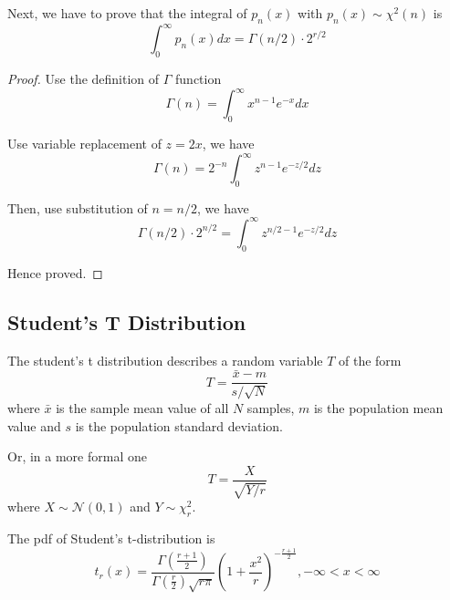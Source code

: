 \begin{lemma}
    \label{lemma: The Pdf of Chi-squared Distribution is a Pdf}
    Next, we have to prove that the integral of $p_n(x)$ with $p_n(x) \sim \chi^2(n)$ is
    \begin{equation*}
        \int_0^\infty p_n(x) dx = \Gamma(n/2) \cdot 2^{r/2}
    \end{equation*}

\end{lemma}

\begin{proof}
    Use the definition of $\Gamma$ function
    \begin{equation*}
        \Gamma(n) = \int_0^\infty x^{n-1} e^{-x} dx
    \end{equation*}

    Use variable replacement of $z = 2x$, we have
    \begin{equation*}
        \Gamma(n) = 2^{-n} \int_0^\infty z^{n-1} e^{-z/2} dz
    \end{equation*}

    Then, use substitution of $n = n/2$, we have
    \begin{equation*}
        \Gamma(n/2) \cdot 2^{n/2} = \int_0^\infty z^{n/2-1} e^{-z/2} dz
    \end{equation*}

    Hence proved.

\end{proof}

\subsection{Student's T Distribution}

The student's t distribution describes a random variable $T$ of the form
\begin{equation}
    T = \frac{\bar{x} - m}{s / \sqrt{N}}
\end{equation}
where $\bar{x}$ is the sample mean value of all $N$ samples, $m$ is the population mean value and $s$ is the population standard deviation.

Or, in a more formal one
\begin{equation}
    T = \frac{X}{\sqrt{Y/r}}
\end{equation}
where $X \sim \mathcal{N}(0, 1)$ and $Y \sim \chi_r^2$.

The pdf of Student's t-distribution is
\begin{equation}
    \label{Equation: Pdf of Student's T Distribution}
    t_r(x) = \frac{\Gamma(\frac{r+1}{2})}{\Gamma(\frac{r}{2}) \sqrt{r\pi}} (1+\frac{x^2}{r})^{-\frac{r+1}{2}}, -\infty < x < \infty
\end{equation}

